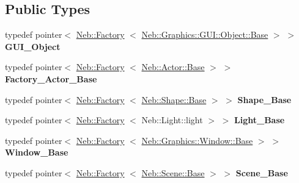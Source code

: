 \subsection*{\-Public \-Types}
\begin{DoxyCompactItemize}
\item 
\hypertarget{classNeb_1_1App_1_1BaseFactory_a7900d6b4a474fc9d95b62c23306af2fa}{typedef pointer$<$ \hyperlink{classNeb_1_1Factory}{\-Neb\-::\-Factory}\*
$<$ \hyperlink{classNeb_1_1Graphics_1_1GUI_1_1Object_1_1Base}{\-Neb\-::\-Graphics\-::\-G\-U\-I\-::\-Object\-::\-Base} $>$ $>$ {\bfseries \-G\-U\-I\-\_\-\-Object}}\label{classNeb_1_1App_1_1BaseFactory_a7900d6b4a474fc9d95b62c23306af2fa}

\item 
\hypertarget{classNeb_1_1App_1_1BaseFactory_adb13eef681dd64d83bd14d29adcab67c}{typedef pointer$<$ \hyperlink{classNeb_1_1Factory}{\-Neb\-::\-Factory}\*
$<$ \hyperlink{classNeb_1_1Actor_1_1Base}{\-Neb\-::\-Actor\-::\-Base} $>$ $>$ {\bfseries \-Factory\-\_\-\-Actor\-\_\-\-Base}}\label{classNeb_1_1App_1_1BaseFactory_adb13eef681dd64d83bd14d29adcab67c}

\item 
\hypertarget{classNeb_1_1App_1_1BaseFactory_ad68d4c2c4834639335124a003e34b37c}{typedef pointer$<$ \hyperlink{classNeb_1_1Factory}{\-Neb\-::\-Factory}\*
$<$ \hyperlink{classNeb_1_1Shape_1_1Base}{\-Neb\-::\-Shape\-::\-Base} $>$ $>$ {\bfseries \-Shape\-\_\-\-Base}}\label{classNeb_1_1App_1_1BaseFactory_ad68d4c2c4834639335124a003e34b37c}

\item 
\hypertarget{classNeb_1_1App_1_1BaseFactory_ad77d1d1ba2072913470814fa00f7639c}{typedef pointer$<$ \hyperlink{classNeb_1_1Factory}{\-Neb\-::\-Factory}\*
$<$ \-Neb\-::\-Light\-::light $>$ $>$ {\bfseries \-Light\-\_\-\-Base}}\label{classNeb_1_1App_1_1BaseFactory_ad77d1d1ba2072913470814fa00f7639c}

\item 
\hypertarget{classNeb_1_1App_1_1BaseFactory_a2e1133c47fbc9aec044fe8b98ea33d21}{typedef pointer$<$ \hyperlink{classNeb_1_1Factory}{\-Neb\-::\-Factory}\*
$<$ \hyperlink{classNeb_1_1Graphics_1_1Window_1_1Base}{\-Neb\-::\-Graphics\-::\-Window\-::\-Base} $>$ $>$ {\bfseries \-Window\-\_\-\-Base}}\label{classNeb_1_1App_1_1BaseFactory_a2e1133c47fbc9aec044fe8b98ea33d21}

\item 
\hypertarget{classNeb_1_1App_1_1BaseFactory_a4d57ec8c91ce0c02f40c5a9ecb0bae6f}{typedef pointer$<$ \hyperlink{classNeb_1_1Factory}{\-Neb\-::\-Factory}\*
$<$ \hyperlink{classNeb_1_1Scene_1_1Base}{\-Neb\-::\-Scene\-::\-Base} $>$ $>$ {\bfseries \-Scene\-\_\-\-Base}}\label{classNeb_1_1App_1_1BaseFactory_a4d57ec8c91ce0c02f40c5a9ecb0bae6f}

\end{DoxyCompactItemize}

